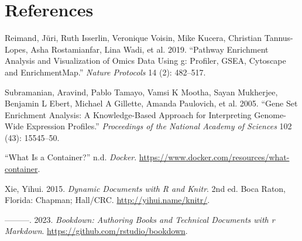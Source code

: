 \documentclass[
]{book}
\newlength{\cslhangindent}
\newlength{\cslentryspacingunit} %
\newenvironment{CSLReferences}[2] %
 {%
  \setlength{\parindent}{0pt}
  \ifodd #1
  \let\oldpar\par
  \def\par{\hangindent=\cslhangindent\oldpar}
  \fi
  \setlength{\parskip}{#2\cslentryspacingunit}
 }%
 {}
\begin{document}
\hypertarget{references}{%
\chapter{References}\label{references}}

\hypertarget{refs}{}
\begin{CSLReferences}{1}{0}
\leavevmode{}%
Reimand, Jüri, Ruth Isserlin, Veronique Voisin, Mike Kucera, Christian Tannus-Lopes, Asha Rostamianfar, Lina Wadi, et al. 2019. {``Pathway Enrichment Analysis and Visualization of Omics Data Using g: Profiler, GSEA, Cytoscape and EnrichmentMap.''} \emph{Nature Protocols} 14 (2): 482--517.

\leavevmode{}%
Subramanian, Aravind, Pablo Tamayo, Vamsi K Mootha, Sayan Mukherjee, Benjamin L Ebert, Michael A Gillette, Amanda Paulovich, et al. 2005. {``Gene Set Enrichment Analysis: A Knowledge-Based Approach for Interpreting Genome-Wide Expression Profiles.''} \emph{Proceedings of the National Academy of Sciences} 102 (43): 15545--50.

\leavevmode{}%
{``What Is a Container?''} n.d. \emph{Docker}. \url{https://www.docker.com/resources/what-container}.

\leavevmode{}%
Xie, Yihui. 2015. \emph{Dynamic Documents with {R} and Knitr}. 2nd ed. Boca Raton, Florida: Chapman; Hall/CRC. \url{http://yihui.name/knitr/}.

\leavevmode{}%
---------. 2023. \emph{Bookdown: Authoring Books and Technical Documents with r Markdown}. \url{https://github.com/rstudio/bookdown}.

\end{CSLReferences}
\end{document}

